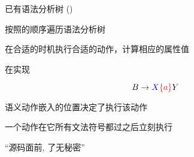 \begin{frame}{}
  \begin{center}
     已有语法分析树 ()

    \vspace{0.50cm}

    \pause
    \vspace{0.50cm}
    按照的顺序遍历语法分析树

    \vspace{0.50cm}
     在合适的时机执行合适的动作，计算相应的属性值
  \end{center}
\end{frame}

\begin{frame}{}
  \begin{center}
    在实现
  \end{center}

  \[
    B \to \textcolor{blue}{X} \textcolor{red}{\{a\}} Y
  \]

  \pause
  \vspace{0.80cm}
  \begin{center}
    语义动作嵌入的位置决定了执行该动作

    \vspace{0.60cm}
     一个动作在它所有文法符号都过之后立刻执行
  \end{center}
\end{frame}

\begin{frame}{}
  \begin{center}

    \vspace{0.30cm}
  \end{center}
\end{frame}

\begin{frame}{}
  \begin{center}

    \vspace{0.50cm}
  \end{center}
\end{frame}

\begin{frame}{}
  \begin{center}
    ``源码面前, 了无秘密''


  \end{center}
\end{frame}

